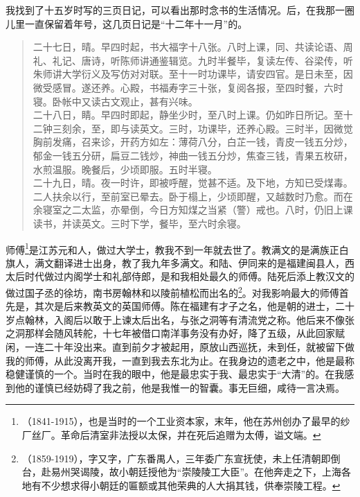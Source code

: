 我找到了十五岁时写的三页日记，可以看出那时念书的生活情况。后，在我那一圈儿里一直保留着年号，这几页日记是“十二年十一月”的。\\

\begin{quote}
	二十七日，晴。早四时起，书大福字十八张。八时上课，同、共读论语、周礼、礼记、唐诗，听陈师讲通鉴辑览。九时半餐毕，复读左传、谷梁传，听朱师讲大学衍义及写仿对对联。至十一时功课毕，请安四官。是日未至，因微受感冒。遂还养。心殿，书福寿字三十张，复阅各报，至四时餐，六时寝。卧帐中又读古文观止，甚有兴味。\\

二十八日，睛。早四时即起，静坐少时，至八时上课。仍如昨日所记。至十二钟三刻余，至，即与读英文。三时，功课毕，还养心殿。三时半，因微觉胸前发痛，召来诊，开药方如左：薄荷八分，白芷一钱，青皮一钱五分炒，郁金一钱五分研，扁豆二钱炒，神曲一钱五分炒，焦查三钱，青果五枚研，水煎温服。晚餐后，少顷即服。五时半寝。\\

二十九日，晴。夜一时许，即被呼醒，觉甚不适。及下地，方知已受煤毒。二人扶余以行，至前室已晕去。卧于榻上，少顷即醒，又越数时乃愈。而在余寝室之二太监，亦晕倒，今日方知煤之当紧（警）戒也。八时，仍旧上课读书，并读英文。三时下学，餐毕，至六时余寝。\\
\end{quote}

师傅\footnote{（1841-1915），也是当时的一个工业资本家，末年，他在苏州创办了最早的纱厂丝厂。革命后清室非法授以太保，并在死后追赠为太傅，谥文端。}是江苏元和人，做过大学士，教我不到一年就去世了。教满文的是满族正白旗人，满文翻译进士出身，教了我九年多满文。和陆、伊同来的是福建闽县人，西太后时代做过内阁学士和礼部侍郎，是和我相处最久的师傅。陆死后添上教汉文的做过国子丞的徐坊，南书房翰林和以陵前植松而出名的\footnote{（1859-1919），字又字，广东番禺人，三年委广东宣抚使，未上任清朝即倒台，赴易州哭谒陵，故小朝廷授他为“崇陵陵工大臣”。在他奔走之下，上海各地有不少想求得小朝廷的匾额或其他荣典的人大捐其钱，供奉崇陵工程。}。对我影响最大的师傅首先是，其次是后来教英文的英国师傅。陈在福建有才子之名，他是朝的进士，二十岁点翰林，入阁后以敢于上谏太后出名，与张之洞等有清流党之称。他后来不像张之洞那样会随风转舵，十七年被借口南洋事务没有办好，降了五级，从此回家赋闲，一连二十年没出来。直到前夕才被起用，原放山西巡抚，未到任，就被留下做我的师傅，从此没离开我，一直到我去东北为止。在我身边的遗老之中，他是最称稳健谨慎的一个。当时在我的眼中，他是最忠实于我、最忠实于“大清”的。在我感到他的谨慎已经妨碍了我之前，他是我惟一的智囊。事无巨细，咸待一言决焉。\\

